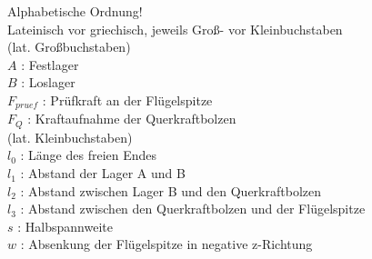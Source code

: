 
Alphabetische Ordnung!\\ 
Lateinisch vor griechisch, jeweils Groß- vor Kleinbuchstaben\\
(lat. Großbuchstaben)\\

\noindent $ A $ : Festlager\\
$ B $ : Loslager\\
$ F_{pruef} $ : Prüfkraft an der Flügelspitze\\
$ F_{Q} $ : Kraftaufnahme der Querkraftbolzen \\



\noindent (lat. Kleinbuchstaben)\\

\noindent $l_{0}$ : Länge des freien Endes\\
$l_{1}$ : Abstand der Lager A und B\\
$l_{2}$ : Abstand zwischen Lager B und den Querkraftbolzen\\
\noindent $l_{3}$ : Abstand zwischen den Querkraftbolzen und der Flügelspitze\\
$ s $ : Halbspannweite\\
$ w $ : Absenkung der Flügelspitze in negative z-Richtung



